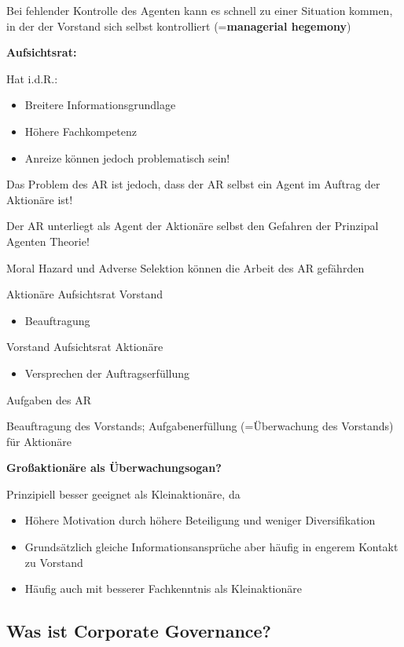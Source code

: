 \documentclass[
]{article}
\providecommand{\tightlist}{%
  \setlength{\itemsep}{0pt}\setlength{\parskip}{0pt}}
\begin{document}
Bei fehlender Kontrolle des Agenten kann es schnell zu einer Situation
kommen, in der der Vorstand sich selbst kontrolliert
(=\textbf{managerial hegemony})

\textbf{Aufsichtsrat:}

Hat i.d.R.:

\begin{itemize}
\tightlist
\item
  Breitere Informationsgrundlage
\item
  Höhere Fachkompetenz
\item
  Anreize können jedoch problematisch sein!
\end{itemize}

Das Problem des AR ist jedoch, dass der AR selbst ein Agent im Auftrag
der Aktionäre ist!

Der AR unterliegt als Agent der Aktionäre selbst den Gefahren der
Prinzipal Agenten Theorie!

Moral Hazard und Adverse Selektion können die Arbeit des AR gefährden

Aktionäre Aufsichtsrat Vorstand

\begin{itemize}
\tightlist
\item
  Beauftragung
\end{itemize}

Vorstand Aufsichtsrat Aktionäre

\begin{itemize}
\tightlist
\item
  Versprechen der Auftragserfüllung
\end{itemize}

Aufgaben des AR

Beauftragung des Vorstands; Aufgabenerfüllung (=Überwachung des
Vorstands) für Aktionäre

\textbf{Großaktionäre als Überwachungsogan?}

Prinzipiell besser geeignet als Kleinaktionäre, da

\begin{itemize}
\tightlist
\item
  Höhere Motivation durch höhere Beteiligung und weniger Diversifikation
\item
  Grundsätzlich gleiche Informationsansprüche aber häufig in engerem
  Kontakt zu Vorstand
\item
  Häufig auch mit besserer Fachkenntnis als Kleinaktionäre
\end{itemize}

\hypertarget{was-ist-corporate-governance}{%
\subsection{Was ist Corporate
Governance?}\label{was-ist-corporate-governance}}
\end{document}
